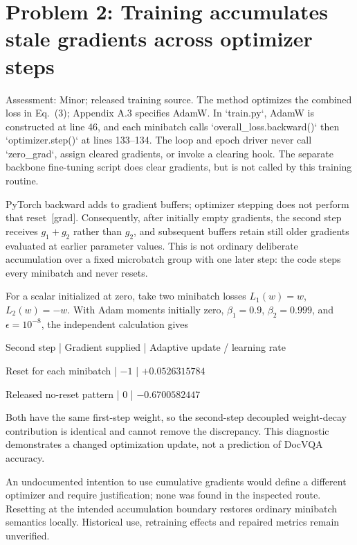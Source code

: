 \documentclass[10pt]{article}
\begin{document}
\section*{Problem 2: Training accumulates stale gradients across optimizer steps}
Assessment: Minor; released training source. The method optimizes the combined loss in Eq. (3); Appendix A.3 specifies AdamW. In `train.py`, AdamW is constructed at line 46, and each minibatch calls `overall\_loss.backward()` then `optimizer.step()` at lines 133–134. The loop and epoch driver never call `zero\_grad`, assign cleared gradients, or invoke a clearing hook. The separate backbone fine-tuning script does clear gradients, but is not called by this training routine.\par
PyTorch backward adds to gradient buffers; optimizer stepping does not perform that reset [grad]. Consequently, after initially empty gradients, the second step receives \(g_1+g_2\) rather than \(g_2\), and subsequent buffers retain still older gradients evaluated at earlier parameter values. This is not ordinary deliberate accumulation over a fixed microbatch group with one later step: the code steps every minibatch and never resets.\par
For a scalar initialized at zero, take two minibatch losses \(L_1(w)=w\), \(L_2(w)=-w\). With Adam moments initially zero, \(\beta_1=0.9\), \(\beta_2=0.999\), and \(\epsilon=10^{-8}\), the independent calculation gives\par
Second step | Gradient supplied | Adaptive update / learning rate\par
Reset for each minibatch | \(-1\) | \(+0.0526315784\)\par
Released no-reset pattern | \(0\) | \(-0.6700582447\)\par
Both have the same first-step weight, so the second-step decoupled weight-decay contribution is identical and cannot remove the discrepancy. This diagnostic demonstrates a changed optimization update, not a prediction of DocVQA accuracy.\par
An undocumented intention to use cumulative gradients would define a different optimizer and require justification; none was found in the inspected route. Resetting at the intended accumulation boundary restores ordinary minibatch semantics locally. Historical use, retraining effects and repaired metrics remain unverified.\par
\end{document}
